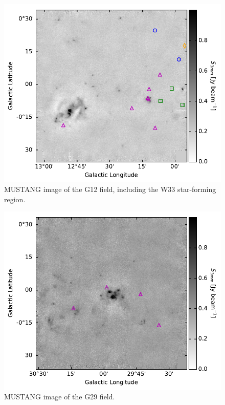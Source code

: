 \documentclass[twocolumn]{aastex62}
\begin{document}
\begin{figure}[htp]
\includegraphics[width=17cm]{figures/G12_overview_withcatalog.pdf}
\caption{MUSTANG image of the G12 field, including the W33 star-forming region.}
\label{fig:g12overview}
\end{figure}

\begin{figure}[htp]
\includegraphics[width=17cm]{figures/G29_overview_withcatalog.pdf}
\caption{MUSTANG image of the G29 field.}
\label{fig:g29overview}
\end{figure}
\end{document}

